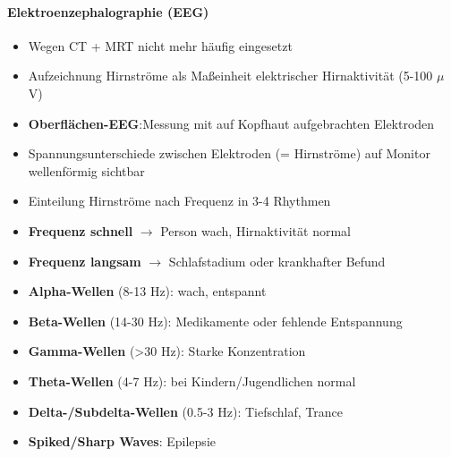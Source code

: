 \paragraph{Elektroenzephalographie (EEG)}
\begin{itemize}
  \item Wegen CT + MRT nicht mehr häufig eingesetzt
  \item Aufzeichnung Hirnströme als Maßeinheit elektrischer Hirnaktivität (5-100 \( \mu \)V)
  \item \textbf{Oberflächen-EEG}:\@ Messung mit auf Kopfhaut aufgebrachten Elektroden
  \item Spannungsunterschiede zwischen Elektroden (= Hirnströme) auf Monitor wellenförmig sichtbar
  \item Einteilung Hirnströme nach Frequenz in 3-4 Rhythmen
  \item \textbf{Frequenz schnell} \( \to \) Person wach, Hirnaktivität normal
  \item \textbf{Frequenz langsam} \( \to \) Schlafstadium oder krankhafter Befund
  \item \textbf{Alpha-Wellen} (8-13 Hz): wach, entspannt
  \item \textbf{Beta-Wellen} (14-30 Hz): Medikamente oder fehlende Entspannung
  \item \textbf{Gamma-Wellen} (>30 Hz): Starke Konzentration
  \item \textbf{Theta-Wellen} (4-7 Hz): bei Kindern/Jugendlichen normal
  \item \textbf{Delta-/Subdelta-Wellen} (0.5-3 Hz): Tiefschlaf, Trance
  \item \textbf{Spiked/Sharp Waves}: Epilepsie
\end{itemize}

